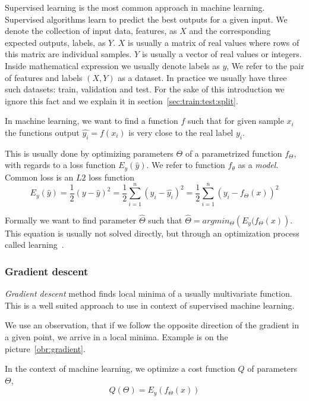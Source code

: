     Supervised learning is the most common approach in machine learning. 
    Supervised algorithms learn to predict the best outputs for a given input.
    We denote the collection of input data, features, as $X$ and the corresponding expected outputs, labels, as $Y$.
    $X$ is usually a matrix of real values where rows of this matrix are individual samples.
    $Y$ is usually a vector of real values or integers. 
    Inside mathematical expression we usually denote labels as $y$,
    We refer to the pair of features and labels $(X, Y)$ as a dataset.
    In practice we usually have three such datasets: train, validation and test. 
    For the sake of this introduction we ignore this fact and we explain it in section~\ref{sec:train:test:split}.
    
    In machine learning, we want to find a function $f$ such that for given sample $x_i$
    the functions output $\hat{y_i} = f(x_i)$ is very close to the real label $y_i$.
    
    This is usually done by optimizing parameters $\Theta$ of a parametrized function $f_\Theta$,
    with regards to a loss function $E_y(\hat{y})$. 
    We refer to function $f_\theta$ as a \textit{model}.
    Common loss is an $L2$ loss function 
    $$E_y(\hat{y}) = \frac{1}{2}(y - \hat{y})^2 = \frac{1}{2}\sum_{i=1}^n (y_i - \hat{y_i})^2= \frac{1}{2}\sum_{i=1}^n (y_i - f_\Theta(x))^2$$  
    
    Formally we want to find parameter $\hat{\Theta}$ such that $\hat{\Theta} = argmin_\Theta \left(E_y(f_\Theta(x) \right)$. 
    This equation is usually not solved directly, but through an optimization process called learning~\cite{Goodfellow-et-al-2016}. %
    
    \subsubsection{Gradient descent}

    \textit{Gradient descent} method finds local minima of a usually multivariate function. 
    This is a well suited approach to use in context of supervised machine learning. 
    
    We use an observation, that if we follow the opposite direction of the gradient in a given point, 
    we arrive in a local minima. Example is on the picture~\ref{obr:gradient}.
    
    In the context of machine learning, we optimize a cost function $Q$ of parameters $\Theta$, 
    $$Q(\Theta) = E_y(f_\Theta(x))$$
    
